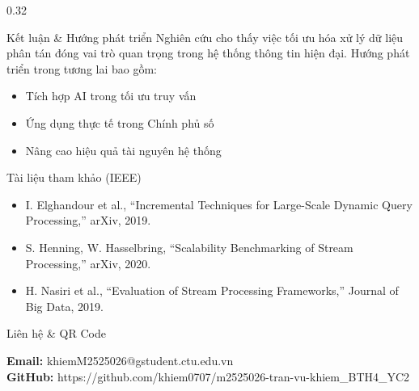 \documentclass[final]{beamer}
\begin{document}
\begin{frame}[t]
\begin{columns}[t,totalwidth=\textwidth]
\begin{column}{0.32\textwidth}
\begin{block}{Kết luận \& Hướng phát triển}
Nghiên cứu cho thấy việc tối ưu hóa xử lý dữ liệu phân tán đóng vai trò quan trọng
trong hệ thống thông tin hiện đại.
Hướng phát triển trong tương lai bao gồm:
\begin{itemize}
    \item Tích hợp AI trong tối ưu truy vấn
    \item Ứng dụng thực tế trong Chính phủ số
    \item Nâng cao hiệu quả tài nguyên hệ thống
\end{itemize}
\end{block}

\begin{block}{Tài liệu tham khảo (IEEE)}
\begin{itemize}
    \item[1] I. Elghandour et al., ``Incremental Techniques for Large-Scale Dynamic Query Processing,'' arXiv, 2019.
    \item[2] S. Henning, W. Hasselbring, ``Scalability Benchmarking of Stream Processing,'' arXiv, 2020.
    \item[3] H. Nasiri et al., ``Evaluation of Stream Processing Frameworks,'' Journal of Big Data, 2019.
\end{itemize}
\end{block}

\begin{block}{Liên hệ \& QR Code}
\centering
{}

\vspace{0.4cm}
\textbf{Email:} khiemM2525026@gstudent.ctu.edu.vn \\
\textbf{GitHub:} https://github.com/khiem0707/m2525026-tran-vu-khiem_BTH4_YC2
\end{block}

\end{column}

\end{columns}

\end{frame}
\end{document}
